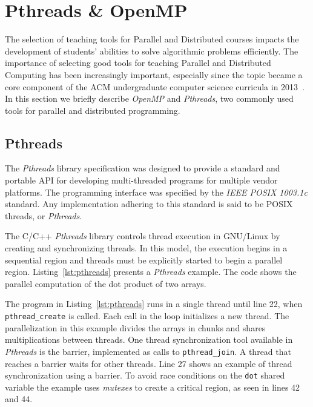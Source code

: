 \section{Pthreads \& OpenMP}
\label{sec:apis}

The selection of teaching tools for Parallel and Distributed courses impacts
the development of students' abilities to solve algorithmic problems
efficiently. The importance of selecting good tools for teaching Parallel and
Distributed Computing has been increasingly important, especially since the
topic became a core component of the ACM undergraduate computer science
curricula in 2013~\cite{acmcurricula}.  In this section we briefly describe
\textit{OpenMP} and \textit{Pthreads}, two commonly used tools for parallel and
distributed programming.

\subsection{Pthreads}

The \textit{Pthreads} library specification was designed to provide a standard
and portable API for developing multi-threaded programs for multiple vendor
platforms.  The programming interface was specified by the \textit{IEEE POSIX
1003.1c} standard. Any implementation adhering to this standard is said to be
POSIX threads, or \textit{Pthreads}.

The C/C++ \textit{Pthreads} library controls thread execution in GNU/Linux by
creating and synchronizing threads. In this model, the execution begins in a
sequential region and threads must be explicitly started to begin a parallel
region.  Listing~\ref{lst:pthreads} presents a \textit{Pthreads}
example. The code shows the parallel computation of the dot product of two
arrays.

The program in Listing~\ref{lst:pthreads} runs in a single thread until
line 22, when \texttt{pthread\_create} is called.  Each call
in the loop initializes a new thread.
The parallelization in this example divides the arrays in chunks
and shares multiplications between threads.
One thread synchronization tool available in \textit{Pthreads} is the barrier,
implemented as calls to \texttt{pthread\_join}. A thread that reaches a barrier
waits for other threads. Line 27 shows an example of thread synchronization
using a barrier.
To avoid race conditions on the \texttt{dot} shared variable
the example uses \textit{mutexes} to create a critical
region, as seen in lines 42 and 44.

